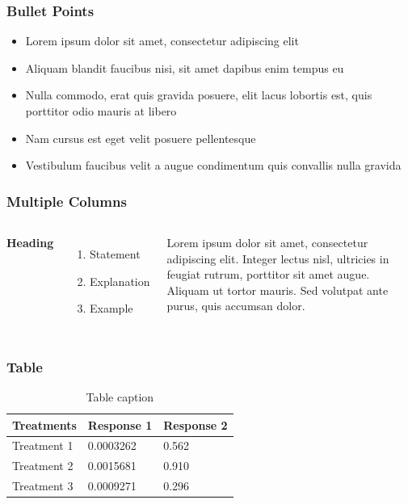 \documentclass{beamer}
\begin{document}

\begin{frame}
  \frametitle{Bullet Points}
  \begin{itemize}
  \item Lorem ipsum dolor sit amet, consectetur adipiscing elit
  \item Aliquam blandit faucibus nisi, sit amet dapibus enim tempus eu
  \item Nulla commodo, erat quis gravida posuere, elit lacus lobortis
    est, quis porttitor odio mauris at libero
  \item Nam cursus est eget velit posuere pellentesque
  \item Vestibulum faucibus velit a augue condimentum quis convallis
    nulla gravida
  \end{itemize}
\end{frame}


\begin{frame}
  \frametitle{Multiple Columns}

  \begin{columns}[c] %

    \textbf{Heading}
    \begin{enumerate}
    \item Statement
    \item Explanation
    \item Example
    \end{enumerate}

    Lorem ipsum dolor sit amet, consectetur adipiscing elit. Integer
    lectus nisl, ultricies in feugiat rutrum, porttitor sit amet
    augue. Aliquam ut tortor mauris. Sed volutpat ante purus, quis
    accumsan dolor.

  \end{columns}
\end{frame}


\begin{frame}
\frametitle{Table}
\begin{table}
\begin{tabular}{l l l}
\toprule
\textbf{Treatments} & \textbf{Response 1} & \textbf{Response 2}\\
\midrule
Treatment 1 & 0.0003262 & 0.562 \\
Treatment 2 & 0.0015681 & 0.910 \\
Treatment 3 & 0.0009271 & 0.296 \\
\bottomrule
\end{tabular}
\caption{Table caption}
\end{table}
\end{frame}
\end{document}
